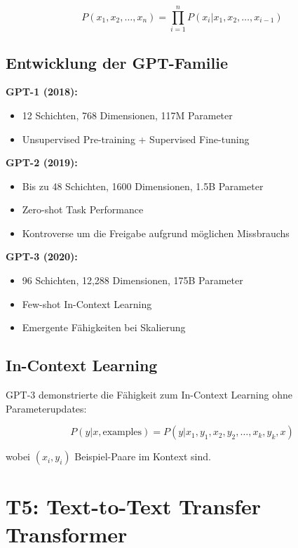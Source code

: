 \begin{equation}
P(x_1, x_2, \ldots, x_n) = \prod_{i=1}^{n} P(x_i | x_1, x_2, \ldots, x_{i-1})
\end{equation}

\subsection{Entwicklung der GPT-Familie}

\textbf{GPT-1 (2018):}
\begin{itemize}
    \item 12 Schichten, 768 Dimensionen, 117M Parameter
    \item Unsupervised Pre-training + Supervised Fine-tuning
\end{itemize}

\textbf{GPT-2 (2019):}
\begin{itemize}
    \item Bis zu 48 Schichten, 1600 Dimensionen, 1.5B Parameter
    \item Zero-shot Task Performance
    \item Kontroverse um die Freigabe aufgrund möglichen Missbrauchs
\end{itemize}

\textbf{GPT-3 (2020):}
\begin{itemize}
    \item 96 Schichten, 12,288 Dimensionen, 175B Parameter
    \item Few-shot In-Context Learning
    \item Emergente Fähigkeiten bei Skalierung
\end{itemize}

\subsection{In-Context Learning}

GPT-3 demonstrierte die Fähigkeit zum In-Context Learning ohne Parameterupdates:

\begin{equation}
P(y | x, \text{examples}) = P(y | x_1, y_1, x_2, y_2, \ldots, x_k, y_k, x)
\end{equation}

wobei $(x_i, y_i)$ Beispiel-Paare im Kontext sind.

\section{T5: Text-to-Text Transfer Transformer}

